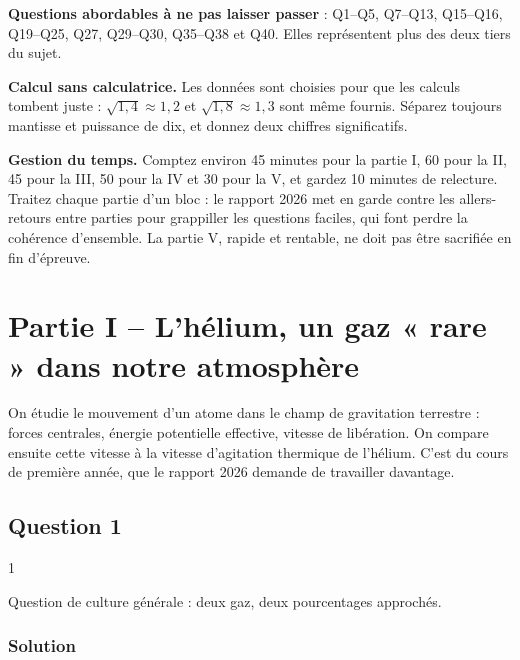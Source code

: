 \documentclass[11pt,a4paper]{article}
\begin{document}
\textbf{Questions abordables à ne pas laisser passer} : Q1--Q5, Q7--Q13, Q15--Q16, Q19--Q25, Q27, Q29--Q30, Q35--Q38 et Q40. Elles représentent plus des deux tiers du sujet.

\textbf{Calcul sans calculatrice.} Les données sont choisies pour que les calculs tombent juste : \(\sqrt{1{,}4}\approx1{,}2\) et \(\sqrt{1{,}8}\approx1{,}3\) sont même fournis. Séparez toujours mantisse et puissance de dix, et donnez deux chiffres significatifs.

\textbf{Gestion du temps.} Comptez environ 45 minutes pour la partie I, 60 pour la II, 45 pour la III, 50 pour la IV et 30 pour la V, et gardez 10 minutes de relecture. Traitez chaque partie d'un bloc : le rapport 2026 met en garde contre les allers-retours entre parties pour grappiller les questions faciles, qui font perdre la cohérence d'ensemble. La partie V, rapide et rentable, ne doit pas être sacrifiée en fin d'épreuve.

\hypertarget{partie-i-lhuxe9lium-un-gaz-rare-dans-notre-atmosphuxe8re}{%
\section{Partie I -- L'hélium, un gaz « rare » dans notre atmosphère}\label{partie-i-lhuxe9lium-un-gaz-rare-dans-notre-atmosphuxe8re}}

On étudie le mouvement d'un atome dans le champ de gravitation terrestre : forces centrales, énergie potentielle effective, vitesse de libération. On compare ensuite cette vitesse à la vitesse d'agitation thermique de l'hélium. C'est du cours de première année, que le rapport 2026 demande de travailler davantage.

\hypertarget{question-1}{%
\subsection{Question 1}\label{question-1}}

\begin{indication}{1}

Question de culture générale : deux gaz, deux pourcentages approchés.

\end{indication}

\hypertarget{solution}{%
\subsubsection{Solution}\label{solution}}
\end{document}
